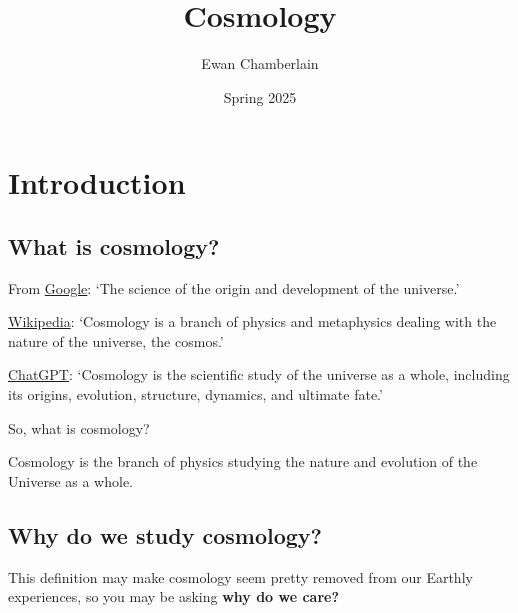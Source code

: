 \documentclass[a4paper, 12pt]{article}
\title{Cosmology}
\author{Ewan Chamberlain}
\date{Spring 2025}
\begin{document}
\maketitle

\section{Introduction}
\subsection{What is cosmology?}
From \href{https://www.google.com/search?q=cosmology+definition&sca_esv=8bb27511c7a3bbb8&ei=tNp_Z_WjLu3HhbIP0OHroQU&ved=0ahUKEwj1zcK36uiKAxXtY0EAHdDwOlQQ4dUDCBA&uact=5&oq=cosmology+definition&gs_lp=Egxnd3Mtd2l6LXNlcnAiFGNvc21vbG9neSBkZWZpbml0aW9uMgoQABiABBhGGPkBMgUQABiABDIFEAAYgAQyBRAAGIAEMgUQABiABDIFEAAYgAQyBRAAGIAEMgUQABiABDIFEAAYgAQyBRAAGIAESJsdUMoDWIMccAV4AZABAJgBW6ABmgiqAQIxNbgBA8gBAPgBAZgCFKAC7QjCAgoQABiwAxjWBBhHwgINEAAYgAQYsAMYQxiKBcICFRAAGIAEGLEDGEMYgwEYigUYRhj5AcICChAAGIAEGEMYigXCAgUQLhiABMICDBAAGIAEGA0YRhj5AcICBxAAGIAEGA3CAgUQIRigAcICDhAAGIAEGAoYDRhGGPkBwgIIEAAYCBgNGB6YAwCIBgGQBgqSBwIyMKAHy8IB&sclient=gws-wiz-serp}{Google}:
`The science of the origin and development of the universe.'

\href{https://en.wikipedia.org/wiki/Cosmology}{Wikipedia}:
`Cosmology is a branch of physics and metaphysics dealing with the nature of the universe, the cosmos.' 

\href{https://chatgpt.com/share/677fdb9a-5f44-800a-8106-8c645bef2ff6}{ChatGPT}:
`Cosmology is the scientific study of the universe as a whole, including its origins, evolution, structure, dynamics, and ultimate fate.'


So, what is cosmology?


Cosmology is the branch of physics studying the nature and evolution of the Universe as a whole.

\subsection{Why do we study cosmology?}
This definition may make cosmology seem pretty removed from our Earthly experiences, so you may be asking \textbf{why do we care?}
\end{document}
